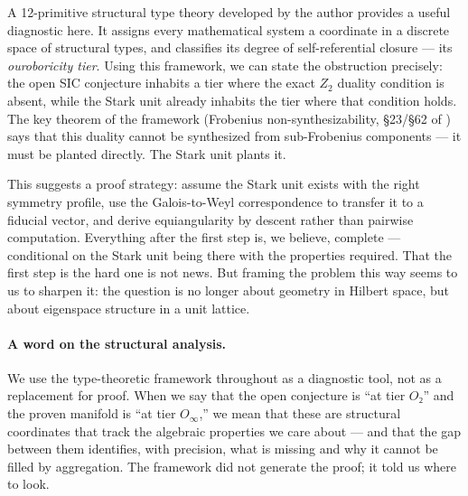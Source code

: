 \documentclass[12pt]{article}
\theoremstyle{plain}
\theoremstyle{definition}
\theoremstyle{remark}
\begin{document}
A 12-primitive structural type theory developed by the author \cite{synthref} provides a useful diagnostic here. It assigns every mathematical system a coordinate in a discrete space of structural types, and classifies its degree of self-referential closure — its \emph{ouroboricity tier}. Using this framework, we can state the obstruction precisely: the open SIC conjecture inhabits a tier where the exact $Z_2$ duality condition is absent, while the Stark unit already inhabits the tier where that condition holds. The key theorem of the framework (Frobenius non-synthesizability, §23/§62 of \cite{prim_theorems}) says that this duality cannot be synthesized from sub-Frobenius components — it must be planted directly. The Stark unit plants it.

This suggests a proof strategy: assume the Stark unit exists with the right symmetry profile, use the Galois-to-Weyl correspondence to transfer it to a fiducial vector, and derive equiangularity by descent rather than pairwise computation. Everything after the first step is, we believe, complete — conditional on the Stark unit being there with the properties required. That the first step is the hard one is not news. But framing the problem this way seems to us to sharpen it: the question is no longer about geometry in Hilbert space, but about eigenspace structure in a unit lattice.

\paragraph{A word on the structural analysis.} We use the type-theoretic framework \cite{synthref} throughout as a diagnostic tool, not as a replacement for proof. When we say that the open conjecture is ``at tier $O₂$'' and the proven manifold is ``at tier $O_\infty$,'' we mean that these are structural coordinates that track the algebraic properties we care about — and that the gap between them identifies, with precision, what is missing and why it cannot be filled by aggregation. The framework did not generate the proof; it told us where to look.
\end{document}
